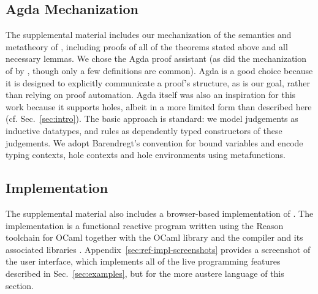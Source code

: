 

\subsection{Agda Mechanization}
\label{sec:agda-mechanization}
\vspace{-3px}

The supplemental material includes our mechanization of the semantics and metatheory of \HazelnutLive, 
including proofs of all of the theorems stated above and all necessary lemmas. We chose the Agda proof assistant \cite{norell2009dependently,norell:thesis} 
(as did the mechanization of \Hazelnut by \citet{popl-paper}, though only a few definitions are common). 
Agda is a good choice because it is designed to explicitly communicate a proof's structure, as is our goal, rather than relying on proof automation. Agda itself was also an inspiration for this work because it supports holes, albeit in a more limited form than described here (cf. Sec.~\ref{sec:intro}). 
The basic approach is standard: we model judgements as 
inductive datatypes, and rules as dependently typed constructors of these judgements. 
We adopt Barendregt's convention for bound variables \cite{urban,barendregt84:_lambda_calculus} and encode typing 
contexts, hole contexts and hole environments using metafunctions.

\subsection{Implementation}\label{sec:implementation}

The supplemental material also includes a browser-based implementation of \HazelnutLive. 
The implementation is a functional reactive program \cite{DBLP:conf/pldi/CzaplickiC13} 
written using the Reason toolchain for OCaml \cite{reason-what,leroy03:_ocaml} 
together with the OCaml  library \cite{OcamlReact} 
and the  compiler and its associated libraries \cite{vouillon2014bytecode}. 
Appendix~\ref{sec:ref-impl-screenshots} provides a screenshot of the user interface, which implements all of the live programming features described in Sec.~\ref{sec:examples}, but for the more austere language of this section.

